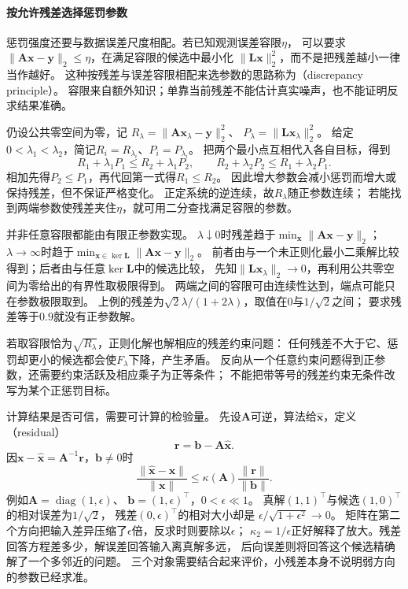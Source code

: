 \paragraph{按允许残差选择惩罚参数}
惩罚强度还要与数据误差尺度相配。若已知观测误差容限$\eta$，
可以要求$\|\bm A\bm x-\bm y\|_2\leq\eta$，在满足容限的候选中最小化
$\|\bm L\bm x\|_2^2$，而不是把残差越小一律当作越好。
这种按残差与误差容限相配来选参数的思路称为（discrepancy principle）。
容限来自额外知识；单靠当前残差不能估计真实噪声，也不能证明反求结果准确。

仍设公共零空间为零，记
$R_\lambda=\|\bm A\bm x_\lambda-\bm y\|_2^2$、
$P_\lambda=\|\bm L\bm x_\lambda\|_2^2$。
给定$0<\lambda_1<\lambda_2$，简记$R_i=R_{\lambda_i}$、$P_i=P_{\lambda_i}$。
把两个最小点互相代入各自目标，得到
\[
 R_1+\lambda_1P_1\leq R_2+\lambda_1P_2,
 \qquad R_2+\lambda_2P_2\leq R_1+\lambda_2P_1.
\]
相加先得$P_2\leq P_1$，再代回第一式得$R_1\leq R_2$。
因此增大参数会减小惩罚而增大或保持残差，但不保证严格变化。
正定系统的逆连续，故$R_\lambda$随正参数连续；
若能找到两端参数使残差夹住$\eta$，就可用二分查找满足容限的参数。

并非任意容限都能由有限正参数实现。
$\lambda\downarrow0$时残差趋于$\min_{\bm x}\|\bm A\bm x-\bm y\|_2$；
$\lambda\to\infty$时趋于$\min_{\bm x\in\ker\bm L}\|\bm A\bm x-\bm y\|_2$。
前者由与一个未正则化最小二乘解比较得到；后者由与任意$\ker\bm L$中的候选比较，
先知$\|\bm L\bm x_\lambda\|_2\to0$，再利用公共零空间为零给出的有界性取极限得到。
两端之间的容限可由连续性达到，端点可能只在参数极限取到。
上例的残差为$\sqrt2\lambda/(1+2\lambda)$，取值在$0$与$1/\sqrt2$之间；
要求残差等于$0.9$就没有正参数解。

若取容限恰为$\sqrt{R_\lambda}$，正则化解也解相应的残差约束问题：
任何残差不大于它、惩罚却更小的候选都会使$F_\lambda$下降，产生矛盾。
反向从一个任意约束问题得到正参数，还需要约束活跃及相应乘子为正等条件；
不能把带等号的残差约束无条件改写为某个正惩罚目标。

计算结果是否可信，需要可计算的检验量。
先设$\bm A$可逆，算法给$\widehat{\bm x}$，定义（residual）
\begin{equation}
 \bm r=\bm b-\bm A\widehat{\bm x}.
 \label{eq:matrix-analysis-residual}
\end{equation}
因$\bm x-\widehat{\bm x}=\bm A^{-1}\bm r$，$\bm b\neq0$时
\[
 \frac{\lVert\widehat{\bm x}-\bm x\rVert}{\lVert\bm x\rVert}
 \leq\kappa(\bm A)\frac{\lVert\bm r\rVert}{\lVert\bm b\rVert}.
\]
例如$\bm A=\operatorname{diag}(1,\epsilon)$、
$\bm b=(1,\epsilon)^\top$，$0<\epsilon\ll1$。
真解$(1,1)^\top$与候选$(1,0)^\top$的相对误差为$1/\sqrt2$，
残差$(0,\epsilon)^\top$的相对大小却是
$\epsilon/\sqrt{1+\epsilon^2}\to0$。
矩阵在第二个方向把输入差异压缩了$\epsilon$倍，反求时则要除以$\epsilon$；
$\kappa_2=1/\epsilon$正好解释了放大。残差回答方程差多少，解误差回答输入离真解多远，
后向误差则将回答这个候选精确解了一个多邻近的问题。
三个对象需要结合起来评价，小残差本身不说明弱方向的参数已经求准。

